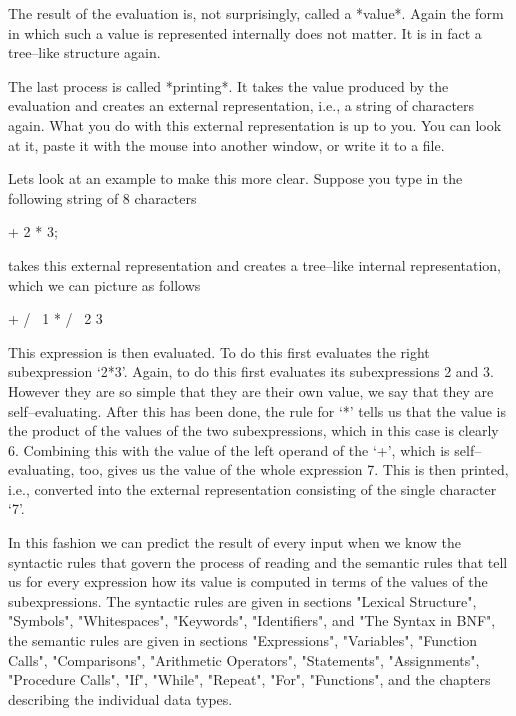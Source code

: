 The result of the evaluation is, not surprisingly, called a *value*.
Again the form in which such a  value is
represented internally does not  matter. It is  in fact a tree--like
structure again.

The last process is called *printing*. It takes the value produced by
the evaluation and creates an external representation, i.e., a string of
characters again. What you do with this external representation is up to
you. You can look at it, paste it with the mouse into another window, or
write it to a file.

Lets look at an example to make this more clear. Suppose you type in the
following string of 8 characters

 + 2 * 3;
\endtt

{\GAP} takes  this external representation  and creates  a tree--like
internal representation, which we can picture as follows

\begintt
  +
 / \
1   *
   / \
  2   3
\endtt

This expression is then evaluated. To do this {\GAP} first evaluates the
right subexpression `2*3'.  Again, to do this {\GAP} first evaluates its
subexpressions 2 and 3. However they are so simple that they are their
own value, we say that they are self--evaluating. After this has been
done, the rule for `*' tells us that the value is the product of the
values of the two subexpressions, which in this case is clearly 6.
Combining this with the value of the left operand of the `+', which is
self--evaluating, too, gives us the value of the whole expression 7. This
is then printed, i.e., converted into the external representation
consisting of the single character `7'.

In this fashion we can predict the result of every input when we know the
syntactic rules that govern the process of reading and the semantic rules
that tell us for every expression how its value is computed in terms of
the values of the subexpressions. The syntactic rules are given in
sections "Lexical Structure",  "Symbols", "Whitespaces", "Keywords",
"Identifiers", and "The Syntax in BNF", the semantic rules are given in
sections "Expressions", "Variables", "Function Calls", "Comparisons",
"Arithmetic Operators",  "Statements", "Assignments", "Procedure Calls",
"If", "While", "Repeat", "For", "Functions", and the chapters describing
the individual data types.

